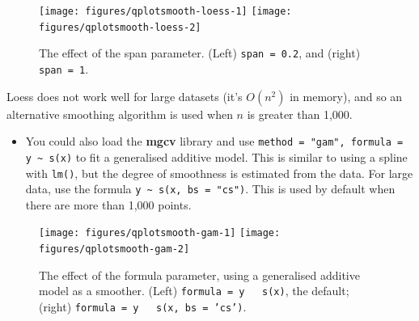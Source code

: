 \begin{figure}
\texttt{[image: figures/qplotsmooth-loess-1]} \texttt{[image: figures/qplotsmooth-loess-2]} \caption{The effect of the span parameter.  (Left) \texttt{span = 0.2}, and (right) \texttt{span = 1}.\label{fig:smooth-loess}}
\end{figure}

\noindent Loess does not work well for large datasets (it's \(O(n^2)\)
in memory), and so an alternative smoothing algorithm is used when \(n\)
is greater than 1,000.

\begin{itemize}
\itemsep1pt\parskip0pt
\item
  You could also load the \textbf{mgcv} library and use
  \texttt{method = "gam", formula = y \textasciitilde{} s(x)} to fit a
  generalised additive model. This is similar to using a spline with
  \texttt{lm()}, but the degree of smoothness is estimated from the
  data. For large data, use the formula
  \texttt{y \textasciitilde{} s(x, bs = "cs")}. This is used by default
  when there are more than 1,000 points. 
\end{itemize}

\begin{Shaded}
\begin{Highlighting}[]
  \NormalTok{(}\NormalTok{, }\NormalTok{), }
   \NormalTok{, } \StringTok{ }
  \NormalTok{(}\NormalTok{, }\NormalTok{), }
   \NormalTok{, } \StringTok{ } \NormalTok{))}
\end{Highlighting}
\end{Shaded}

\begin{figure}
\texttt{[image: figures/qplotsmooth-gam-1]} \texttt{[image: figures/qplotsmooth-gam-2]} \caption{The effect of the formula parameter, using a generalised additive model as a smoother.  (Left) \texttt{formula = y ~ s(x)}, the default; (right) \texttt{formula = y ~ s(x, bs = 'cs')}.\label{fig:smooth-gam}}
\end{figure}


